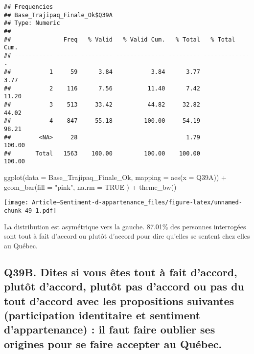 \documentclass[
]{article}
\newenvironment{Shaded}{\begin{snugshade}}{\end{snugshade}}
\newcommand{\AttributeTok}[1]{\textcolor[rgb]{0.77,0.63,0.00}{#1}}
\newcommand{\ConstantTok}[1]{\textcolor[rgb]{0.00,0.00,0.00}{#1}}
\newcommand{\FunctionTok}[1]{\textcolor[rgb]{0.00,0.00,0.00}{#1}}
\newcommand{\NormalTok}[1]{#1}
\newcommand{\SpecialCharTok}[1]{\textcolor[rgb]{0.00,0.00,0.00}{#1}}
\newcommand{\StringTok}[1]{\textcolor[rgb]{0.31,0.60,0.02}{#1}}
\begin{document}
\begin{verbatim}
## Frequencies  
## Base_Trajipaq_Finale_Ok$Q39A  
## Type: Numeric  
## 
##               Freq   % Valid   % Valid Cum.   % Total   % Total Cum.
## ----------- ------ --------- -------------- --------- --------------
##           1     59      3.84           3.84      3.77           3.77
##           2    116      7.56          11.40      7.42          11.20
##           3    513     33.42          44.82     32.82          44.02
##           4    847     55.18         100.00     54.19          98.21
##        <NA>     28                               1.79         100.00
##       Total   1563    100.00         100.00    100.00         100.00
\end{verbatim}

\begin{Shaded}
\begin{Highlighting}[]
\FunctionTok{ggplot}\NormalTok{(}\AttributeTok{data =}\NormalTok{ Base\_Trajipaq\_Finale\_Ok, }\AttributeTok{mapping =} \FunctionTok{aes}\NormalTok{(}\AttributeTok{x =}\NormalTok{ Q39A)) }\SpecialCharTok{+}
  \FunctionTok{geom\_bar}\NormalTok{(}\AttributeTok{fill =} \StringTok{"pink"}\NormalTok{,}
           \AttributeTok{na.rm =} \ConstantTok{TRUE}
\NormalTok{           ) }\SpecialCharTok{+}
  \FunctionTok{theme\_bw}\NormalTok{()}
\end{Highlighting}
\end{Shaded}

\texttt{[image: Article---Sentiment-d-appartenance\_files/figure-latex/unnamed-chunk-49-1.pdf]}

La distribution est asymétrique vers la gauche. 87.01\% des personnes
interrogées sont tout à fait d'accord ou plutôt d'accord pour dire
qu'elles se sentent chez elles au Québec.

\hypertarget{q39b.-dites-si-vous-uxeates-tout-uxe0-fait-daccord-plutuxf4t-daccord-plutuxf4t-pas-daccord-ou-pas-du-tout-daccord-avec-les-propositions-suivantes-participation-identitaire-et-sentiment-dappartenance-il-faut-faire-oublier-ses-origines-pour-se-faire-accepter-au-quuxe9bec.}{%
\subsection{Q39B. Dites si vous êtes tout à fait d'accord, plutôt
d'accord, plutôt pas d'accord ou pas du tout d'accord avec les
propositions suivantes (participation identitaire et sentiment
d'appartenance) : il faut faire oublier ses origines pour se faire
accepter au
Québec.}\label{q39b.-dites-si-vous-uxeates-tout-uxe0-fait-daccord-plutuxf4t-daccord-plutuxf4t-pas-daccord-ou-pas-du-tout-daccord-avec-les-propositions-suivantes-participation-identitaire-et-sentiment-dappartenance-il-faut-faire-oublier-ses-origines-pour-se-faire-accepter-au-quuxe9bec.}}
\end{document}
